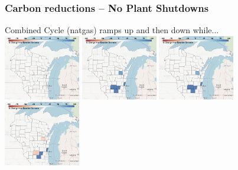 \documentclass[xcolor=dvipsnames]{beamer}
\begin{document}
\begin{frame}
\end{frame}

\begin{frame}
    \frametitle{Carbon reductions -- No Plant Shutdowns}


  Combined Cycle (natgas) ramps up and then down while... \\
  \includegraphics[width=0.25\textwidth]{includes/no_leakage_no_shutdowns_CC_r0.png}
  \includegraphics[width=0.25\textwidth]{includes/no_leakage_no_shutdowns_CC_r2.png}
  \includegraphics[width=0.25\textwidth]{includes/no_leakage_no_shutdowns_CC_r3.png}
  \includegraphics[width=0.25\textwidth]{includes/no_leakage_no_shutdowns_CC_r4.png}




\end{frame}
\end{document}

